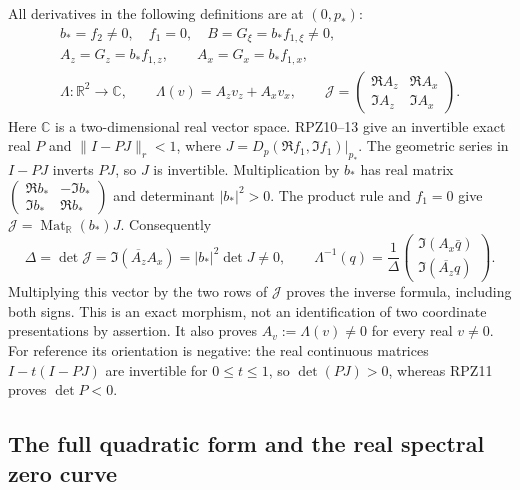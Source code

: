 \documentclass[11pt]{article}
\begin{document}
All derivatives in the following definitions are at $(0,p_*)$:
\[
 \begin{gathered}
 b_*=f_2\ne0,\quad f_1=0,\quad B=G_\xi=b_*f_{1,\xi}\ne0,\\
 A_z=G_z=b_*f_{1,z},\qquad A_x=G_x=b_*f_{1,x},\\
 \Lambda:\mathbb R^2\longrightarrow\mathbb C,\qquad
 \Lambda(v)=A_zv_z+A_xv_x,\qquad
 \mathcal J=\begin{pmatrix}\Re A_z&\Re A_x\\\Im A_z&\Im A_x\end{pmatrix}.
 \end{gathered}
 \tag{RPD3}
\]
Here $\mathbb C$ is a two-dimensional real vector space.  RPZ10--13
give an invertible exact real $P$ and
$\|I-PJ\|_r<1$, where
$J=D_p(\Re f_1,\Im f_1)|_{p_*}$.
The geometric series in $I-PJ$ inverts $PJ$, so $J$ is invertible.
Multiplication by $b_*$ has real matrix
$\left(\begin{smallmatrix}\Re b_*&-\Im b_*\\\Im b_*&\Re b_*\end{smallmatrix}\right)$
and determinant $|b_*|^2>0$.  The product rule and $f_1=0$ give
$\mathcal J=\operatorname{Mat}_{\mathbb R}(b_*)J$.
Consequently
\[
 \Delta=\det\mathcal J=\Im(\overline{A_z}A_x)
       =|b_*|^2\det J\ne0,\qquad
 \Lambda^{-1}(q)=\frac1\Delta
 \begin{pmatrix}\Im(A_x\bar q)\\\Im(\overline{A_z}q)\end{pmatrix}.
 \tag{RPD4}
\]
Multiplying this vector by the two rows of $\mathcal J$ proves the
inverse formula, including both signs.  This is an exact morphism,
not an identification of two coordinate presentations by assertion.
It also proves $A_v:=\Lambda(v)\ne0$ for every real $v\ne0$.
For reference its orientation is negative: the real continuous
matrices $I-t(I-PJ)$ are invertible for $0\le t\le1$, so
$\det(PJ)>0$, whereas RPZ11 proves $\det P<0$.

\subsection{The full quadratic form and the real spectral zero curve}
\end{document}
